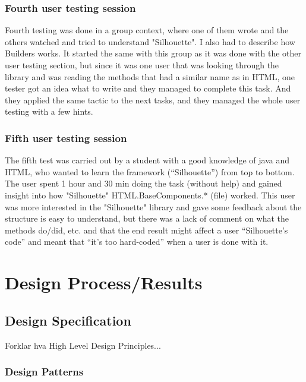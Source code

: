 \documentclass[12pt]{article}
\begin{document}
        \subsubsection{Fourth user testing session}
        Fourth testing was done in a group context, where one of them wrote and the others watched and tried to understand "Silhouette". I also had to describe how Builders works. 
        It started the same with this group as it was done with the other user testing section, but since it was one user that was looking through the library and was reading the methods that had a similar name as in HTML, one tester got an idea what to write and they managed to complete this task. And they applied the same tactic to the next tasks, and they managed the whole user testing with a few hints. 


        \subsubsection{Fifth user testing session}
        The fifth test was carried out by a student with a good knowledge of java and HTML, who wanted to learn the framework (“Silhouette”) from top to bottom. The user spent 1 hour and 30 min doing the task (without help) and gained insight into how "Silhouette" HTML.BaseComponents.* (file) worked. This user was more interested in the "Silhouette" library and gave some feedback about the structure is easy to understand, but there was a lack of comment on what the methods do/did, etc. and that the end result might affect a user “Silhouette’s code” and meant that “it’s too hard-coded” when a user is done with it.


\section{Design Process/Results}

    \subsection{Design Specification}
    Forklar hva High Level Design Principles...

        \subsubsection{Design Patterns}
\end{document}
